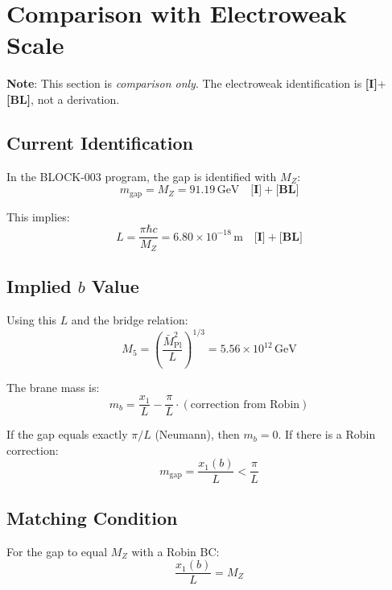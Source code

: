 \documentclass[11pt,a4paper]{article}
\newcommand{\Mpl}{\bar{M}_{\mathrm{Pl}}}
\newcommand{\Mfive}{M_5}
\newcommand{\mgap}{m_{\mathrm{gap}}}
\newcommand{\mb}{m_b}
\newcommand{\MZ}{M_Z}
\newcommand{\GeV}{\,\mathrm{GeV}}
\newcommand{\tagI}{\textbf{[I]}}
\newcommand{\tagBL}{\textbf{[BL]}}
\theoremstyle{definition}
\theoremstyle{plain}
\theoremstyle{remark}
\begin{document}
\section{Comparison with Electroweak Scale}
\label{sec:comparison}

\textbf{Note}: This section is \emph{comparison only}. The electroweak identification
is \tagI{}+\tagBL{}, not a derivation.

\subsection{Current Identification}

In the BLOCK-003 program, the gap is identified with $\MZ$:
\begin{equation}
\mgap = \MZ = 91.19\GeV \quad \tagI{}+\tagBL{}
\label{eq:gap-MZ}
\end{equation}

This implies:
\begin{equation}
L = \frac{\pi\hbar c}{\MZ} = 6.80 \times 10^{-18}\,\mathrm{m} \quad \tagI{}+\tagBL{}
\label{eq:L-from-MZ}
\end{equation}

\subsection{Implied $b$ Value}

Using this $L$ and the bridge relation:
\begin{equation}
\Mfive = \left(\frac{\Mpl^2}{L}\right)^{1/3} = 5.56 \times 10^{12}\GeV
\label{eq:M5-numerical}
\end{equation}

The brane mass is:
\begin{equation}
\mb = \frac{x_1}{L} - \frac{\pi}{L} \cdot (\text{correction from Robin})
\label{eq:mb-numerical}
\end{equation}

If the gap equals exactly $\pi/L$ (Neumann), then $\mb = 0$.
If there is a Robin correction:
\begin{equation}
\mgap = \frac{x_1(b)}{L} < \frac{\pi}{L}
\label{eq:gap-robin}
\end{equation}

\subsection{Matching Condition}

For the gap to equal $\MZ$ with a Robin BC:
\begin{equation}
\frac{x_1(b)}{L} = \MZ
\label{eq:matching}
\end{equation}
\end{document}
